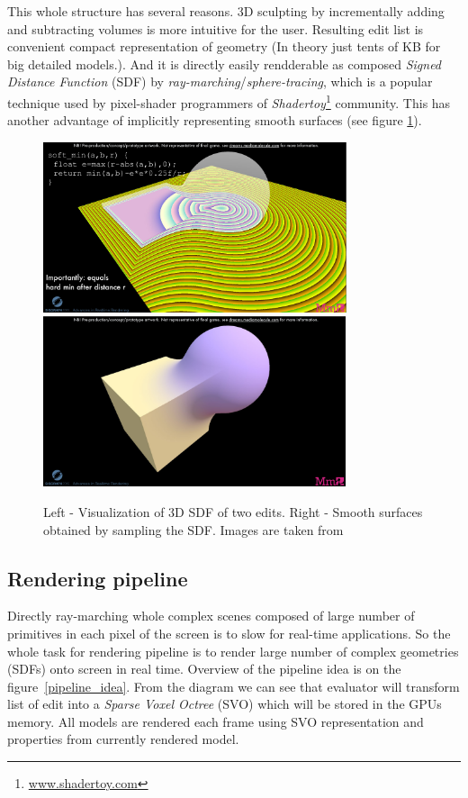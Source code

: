 \documentclass[11pt, a4paper]{article}
\begin{document}
This whole structure has several reasons.
3D sculpting by incrementally adding and subtracting volumes is more intuitive for the user.
Resulting edit list is convenient compact representation of geometry (In theory just tents of KB for big detailed models.).
And it is directly easily rendderable as composed \emph{Signed Distance Function} (SDF) by \emph{ray-marching}/\emph{sphere-tracing}, which is a popular technique used by pixel-shader programmers of \emph{Shadertoy}\footnote{\href{www.shadertoy.com}{www.shadertoy.com}} community.
This has another advantage of implicitly representing smooth surfaces (see figure \ref{ray_marching_fig}).
\begin{figure}
    \centering
    \includegraphics[height=5cm,keepaspectratio]{SDF.png}
    \includegraphics[height=5cm,keepaspectratio]{SDF_RES.png}
    \caption{Left - Visualization of 3D SDF of two edits. Right - Smooth surfaces obtained by sampling the SDF. Images are taken from \cite{evans2015}}
    \label{ray_marching_fig}
\end{figure}
  
\subsection{Rendering pipeline}

Directly ray-marching whole complex scenes composed of large number of primitives in each pixel of the screen is to slow for real-time applications.
So the whole task for rendering pipeline is to render large number of complex geometries (SDFs) onto screen in real time.
Overview of the pipeline idea is on the figure~\ref{pipeline_idea}.
From the diagram we can see that evaluator will transform list of edit into a \emph{Sparse Voxel Octree} (SVO) which will be stored in the GPUs memory.
All models are rendered each frame using SVO representation and properties from currently rendered model.
\end{document}
